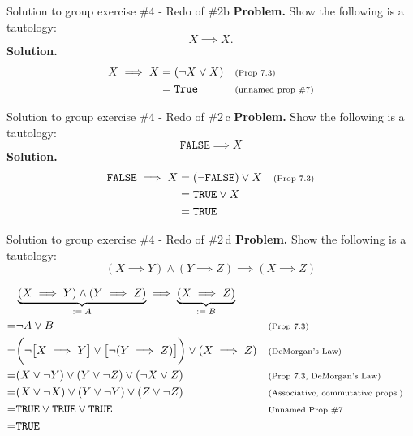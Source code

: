 \documentclass[10pt]{beamer}
\begin{document}
\begin{frame}{Solution to group exercise \#4 - Redo of  \#2b}
\textbf{Problem.} Show the following is a tautology:
\[X \implies X.\]
\vfill 
\textbf{Solution.}
\begin{align*}
X \implies X  &= 	(\lnot X \lor X) && \scripttext{(Prop 7.3)} \\
&= \texttt{True} && \scripttext{(unnamed prop \#7)} 
\end{align*}

\end{frame}


\begin{frame}{Solution to group exercise \#4 - Redo of  \#2\,c}
\textbf{Problem.} Show the following is a tautology:
\[ \texttt{FALSE} \implies X\]
\vfill 
\textbf{Solution.}
%
\begin{align*}
\texttt{FALSE} \implies X  &= 	(\lnot \texttt{FALSE}) \lor X && \scripttext{(Prop 7.3)} \\
&= \texttt{TRUE} \lor X \\
&= \texttt{TRUE}
\end{align*}
\end{frame}

\begin{frame}{Solution to group exercise \#4 - Redo of  \#2\,d}
\footnotesize 
\textbf{Problem.} Show the following is a tautology:
\[ (X \implies Y) \land (Y \implies Z) \implies (X \implies Z) \]

\vfill 
%
\begin{align*}
& \explaintermbrace{$\defeq A$}{(X \implies Y) \land (Y \implies Z)} \implies \explaintermbrace{$\defeq B$}{(X \implies Z)} \\
=& \lnot A \lor B  && \scripttext{(Prop 7.3)}  \\
=& \bigg(  \lnot \big[X \implies Y \big] \lor \big[\lnot (Y \implies Z)\big] \bigg) \lor (X \implies Z)  && \scripttext{(DeMorgan's Law)}  \\
=& (X \lor \lnot Y) \lor (Y \lor \lnot Z) \lor (\lnot X \lor Z) && \scripttext{(Prop 7.3, DeMorgan's Law)}  \\
=& (X \lor \lnot X) \lor (Y \lor \lnot Y) \lor (Z \lor \lnot Z) && \scripttext{(Associative, commutative props.)}  \\
=& \texttt{TRUE}  \lor \texttt{TRUE}\lor \texttt{TRUE} && \scripttext{Unnamed Prop \#7} \\
=& \texttt{TRUE}
\end{align*}
%
\end{frame}
\end{document}
